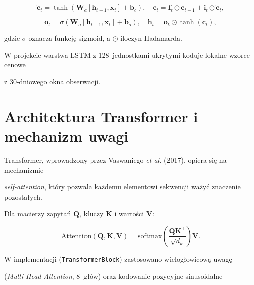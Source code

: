 \documentclass[12pt,a4paper]{report}
\begin{document}
\begin{equation}

    \tilde{\mathbf{c}}_t = \tanh(\mathbf{W}_c [\mathbf{h}_{t-1}, \mathbf{x}_t] + \mathbf{b}_c), \quad

    \mathbf{c}_t = \mathbf{f}_t \odot \mathbf{c}_{t-1} + \mathbf{i}_t \odot \tilde{\mathbf{c}}_t,

\end{equation}

\begin{equation}

    \mathbf{o}_t = \sigma(\mathbf{W}_o [\mathbf{h}_{t-1}, \mathbf{x}_t] + \mathbf{b}_o), \quad

    \mathbf{h}_t = \mathbf{o}_t \odot \tanh(\mathbf{c}_t),

\end{equation}

gdzie $\sigma$ oznacza funkcję sigmoid, a $\odot$ iloczyn Hadamarda.

W projekcie warstwa LSTM z 128~jednostkami ukrytymi koduje lokalne wzorce cenowe

z 30-dniowego okna obserwacji.



\section{Architektura Transformer i mechanizm uwagi}



Transformer, wprowadzony przez Vaswaniego \emph{et al.} (2017), opiera się na mechanizmie

\emph{self-attention}, który pozwala każdemu elementowi sekwencji ważyć znaczenie pozostałych.

Dla macierzy zapytań $\mathbf{Q}$, kluczy $\mathbf{K}$ i wartości $\mathbf{V}$:

\begin{equation}

    \mathrm{Attention}(\mathbf{Q}, \mathbf{K}, \mathbf{V}) =

    \mathrm{softmax}\!\left(\frac{\mathbf{Q}\mathbf{K}^\top}{\sqrt{d_k}}\right)\mathbf{V}.

\end{equation}



W implementacji (\texttt{TransformerBlock}) zastosowano wielogłowicową uwagę

(\emph{Multi-Head Attention}, 8~głów) oraz kodowanie pozycyjne sinusoidalne
\end{document}
